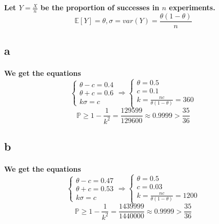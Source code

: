 \documentclass{article}
\begin{document}
    \section{}
        \paragraph{
            Let $Y=\frac{X}{n}$ be the proportion of successes in $n$ experiments.
            $$\mathbb{E}[Y]=\theta, \sigma=var(Y)=\frac{\theta(1-\theta)}{n}$$ 
        }
        \subsection*{a}
             \paragraph{
                 We get the equations
                 \begin{equation*}
                     \begin{cases}
                        \theta-c=0.4\\
                        \theta+c=0.6\\
                         k\sigma=c
                     \end{cases}
                     \Rightarrow
                     \begin{cases}
                        \theta=0.5\\
                         c=0.1\\
                         k=\frac{nc}{\theta(1-\theta)}=360
                     \end{cases}
                 \end{equation*}
                 $$\mathbb{P}\geq 1-\frac{1}{k^2}=\frac{129599}{129600}\approx 0.9999>\frac{35}{36}$$
             }
        \subsection*{b}
        \paragraph{
            We get the equations
            \begin{equation*}
                \begin{cases}
                   \theta-c=0.47\\
                   \theta+c=0.53\\
                    k\sigma=c
                \end{cases}
                \Rightarrow
                \begin{cases}
                   \theta=0.5\\
                    c=0.03\\
                    k=\frac{nc}{\theta(1-\theta)}=1200
                \end{cases}
            \end{equation*}
            $$\mathbb{P}\geq 1-\frac{1}{k^2}=\frac{1439999}{1440000}\approx 0.9999>\frac{35}{36}$$
        }
\end{document}
